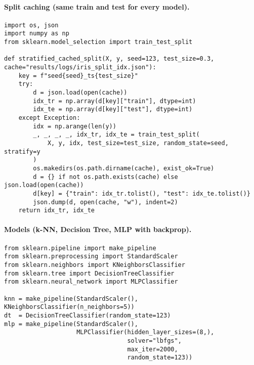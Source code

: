 \documentclass[11pt,a4paper]{article}
\begin{document}
\paragraph{Split caching (same train and test for every model).}
\begin{lstlisting}[style=mypython,caption={Stratified split with cached indices for reproducibility},label={lst:iris-split}]
import os, json
import numpy as np
from sklearn.model_selection import train_test_split

def stratified_cached_split(X, y, seed=123, test_size=0.3, cache="results/logs/iris_split_idx.json"):
    key = f"seed{seed}_ts{test_size}"
    try:
        d = json.load(open(cache))
        idx_tr = np.array(d[key]["train"], dtype=int)
        idx_te = np.array(d[key]["test"], dtype=int)
    except Exception:
        idx = np.arange(len(y))
        _, _, _, _, idx_tr, idx_te = train_test_split(
            X, y, idx, test_size=test_size, random_state=seed, stratify=y
        )
        os.makedirs(os.path.dirname(cache), exist_ok=True)
        d = {} if not os.path.exists(cache) else json.load(open(cache))
        d[key] = {"train": idx_tr.tolist(), "test": idx_te.tolist()}
        json.dump(d, open(cache, "w"), indent=2)
    return idx_tr, idx_te
\end{lstlisting}

\paragraph{Models (k-NN, Decision Tree, MLP with backprop).}
\begin{lstlisting}[style=mypython,caption={Model definitions with standardization where useful},label={lst:iris-models}]
from sklearn.pipeline import make_pipeline
from sklearn.preprocessing import StandardScaler
from sklearn.neighbors import KNeighborsClassifier
from sklearn.tree import DecisionTreeClassifier
from sklearn.neural_network import MLPClassifier

knn = make_pipeline(StandardScaler(), KNeighborsClassifier(n_neighbors=5))
dt  = DecisionTreeClassifier(random_state=123)
mlp = make_pipeline(StandardScaler(),
                    MLPClassifier(hidden_layer_sizes=(8,),
                                  solver="lbfgs",
                                  max_iter=2000,
                                  random_state=123))
\end{lstlisting}
\end{document}
